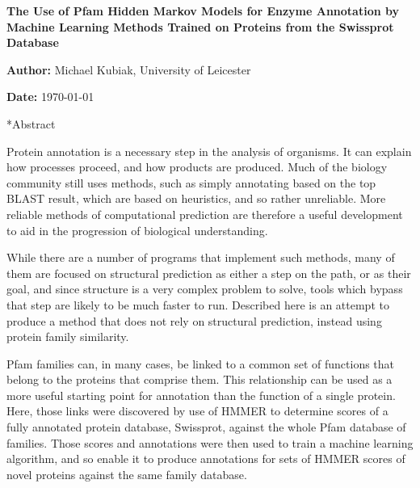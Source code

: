 \documentclass[12pt]{article}
\makeatletter
\renewcommand\section{\@startsection{section}{4}{\z@}
            {-2.5ex\@plus -1ex \@minus -.25ex}
            {1ex \@plus .25ex}
            {\normalfont\LARGE\bfseries}}
\makeatother
\begin{document}
	\vspace*{\fill}
		\begin{center}
			\huge\textbf{The Use of Pfam Hidden Markov Models for Enzyme Annotation by Machine Learning Methods Trained on Proteins from the Swissprot Database}

			\vspace*{2cm}
			
			\large\textbf{Author:} Michael Kubiak, University of Leicester

			\vspace*{.5cm}

			\textbf{Date:} \today
			
		
		\end{center}
	\vspace*{\fill}

\pagebreak

	\section*{Abstract}
		
		Protein annotation is a necessary step in the analysis of organisms. It can explain how processes proceed, and how products are produced. Much of the biology community still uses methods, such as simply annotating based on the top BLAST result, which are based on heuristics, and so rather unreliable. More reliable methods of computational prediction are therefore a useful development to aid in the progression of biological understanding. 
		
		While there are a number of programs that implement such methods, many of them are focused on structural prediction as either a step on the path, or as their goal, and since structure is a very complex problem to solve, tools which bypass that step are likely to be much faster to run.  Described here is an attempt to produce a method that does not rely on structural prediction, instead using protein family similarity. 
		
		Pfam families can, in many cases, be linked to a common set of functions that belong to the proteins that comprise them. This relationship can be used as a more useful starting point for annotation than the function of a single protein. Here, those links were discovered by use of HMMER to determine scores of a fully annotated protein database, Swissprot, against the whole Pfam database of families.  Those scores and annotations were then used to train a machine learning algorithm, and so enable it to produce annotations for sets of HMMER scores of novel proteins against the same family database.
		
\end{document}
